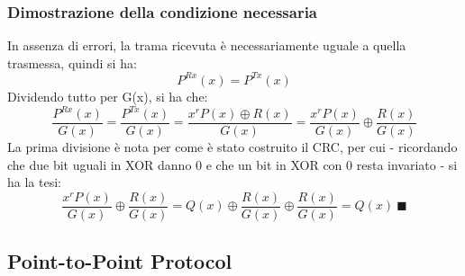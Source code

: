 \documentclass[12pt]{article}
\begin{document}
\subsubsection{Dimostrazione della condizione necessaria}

In assenza di errori, la trama ricevuta è necessariamente uguale a quella trasmessa, quindi si ha:
\begin{equation*}
    P^{Rx}(x) = P^{Tx}(x)
\end{equation*}
Dividendo tutto per G(x), si ha che:
\begin{equation*}
    \frac{P^{Rx}(x)}{G(x)} = \frac{P^{Tx}(x)}{G(x)} = \frac{x^rP(x) \oplus R(x)}{G(x)} = \frac{x^rP(x)}{G(x)} \oplus \frac{R(x)}{G(x)}
\end{equation*}
La prima divisione è nota per come è stato costruito il CRC, per cui - ricordando che due bit uguali in XOR danno 0 e che un bit in XOR con 0 resta invariato - si ha la tesi:
\begin{equation*}
    \frac{x^rP(x)}{G(x)} \oplus \frac{R(x)}{G(x)} = Q(x) \oplus \frac{R(x)}{G(x)} \oplus \frac{R(x)}{G(x)} = Q(x)\ \blacksquare
\end{equation*}

\subsection{Point-to-Point Protocol}
\end{document}
